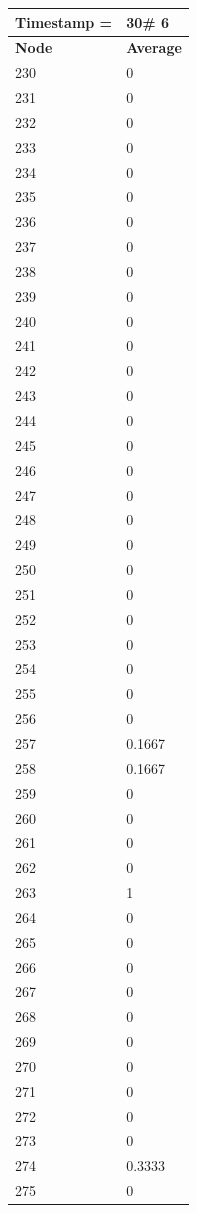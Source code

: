 \begin{tabular}{|l||l|}
\hline
\textbf{Timestamp =} & \textbf{30}\# 6\\\hline
	\textbf{Node} & \textbf{Average} \\ \hline
\hline
	230 & 0 \\ \hline
	231 & 0 \\ \hline
	232 & 0 \\ \hline
	233 & 0 \\ \hline
	234 & 0 \\ \hline
	235 & 0 \\ \hline
	236 & 0 \\ \hline
	237 & 0 \\ \hline
	238 & 0 \\ \hline
	239 & 0 \\ \hline
	240 & 0 \\ \hline
	241 & 0 \\ \hline
	242 & 0 \\ \hline
	243 & 0 \\ \hline
	244 & 0 \\ \hline
	245 & 0 \\ \hline
	246 & 0 \\ \hline
	247 & 0 \\ \hline
	248 & 0 \\ \hline
	249 & 0 \\ \hline
	250 & 0 \\ \hline
	251 & 0 \\ \hline
	252 & 0 \\ \hline
	253 & 0 \\ \hline
	254 & 0 \\ \hline
	255 & 0 \\ \hline
	256 & 0 \\ \hline
	257 & 0.1667 \\ \hline
	258 & 0.1667 \\ \hline
	259 & 0 \\ \hline
	260 & 0 \\ \hline
	261 & 0 \\ \hline
	262 & 0 \\ \hline
	263 & 1 \\ \hline
	264 & 0 \\ \hline
	265 & 0 \\ \hline
	266 & 0 \\ \hline
	267 & 0 \\ \hline
	268 & 0 \\ \hline
	269 & 0 \\ \hline
	270 & 0 \\ \hline
	271 & 0 \\ \hline
	272 & 0 \\ \hline
	273 & 0 \\ \hline
	274 & 0.3333 \\ \hline
	275 & 0 \\ \hline
\end{tabular}

